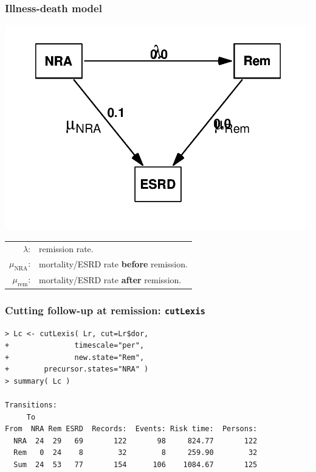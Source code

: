 \begin{frame}
   \frametitle{Illness-death model}
\begin{center}
\includegraphics[height=0.6\textheight,keepaspectratio]{./NRA-death-par3}
\end{center}
\vspace*{-2em}
\begin{tabular}{rl}
$\lambda$: & remission rate.\\
$\mu_\text{NRA}$: & mortality/ESRD rate \textbf{before} remission.\\
$\mu_\text{rem}$: & mortality/ESRD rate \textbf{after} remission.
\end{tabular}
\end{frame}

\begin{frame}[fragile]
  \frametitle{Cutting follow-up at remission: \texttt{cutLexis}}
\renewcommand{\baselinestretch}{0.8}
\footnotesize
\begin{verbatim}
> Lc <- cutLexis( Lr, cut=Lr$dor,
+               timescale="per",
+               new.state="Rem",
+        precursor.states="NRA" )
> summary( Lc )

Transitions:
     To
From  NRA Rem ESRD  Records:  Events: Risk time:  Persons:
  NRA  24  29   69       122       98     824.77       122
  Rem   0  24    8        32        8     259.90        32
  Sum  24  53   77       154      106    1084.67       125
\end{verbatim}
\normalsize
\renewcommand{\baselinestretch}{1.0}
\end{frame}

